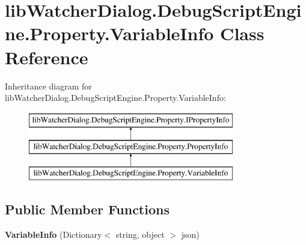 \hypertarget{classlib_watcher_dialog_1_1_debug_script_engine_1_1_property_1_1_variable_info}{\section{lib\+Watcher\+Dialog.\+Debug\+Script\+Engine.\+Property.\+Variable\+Info Class Reference}
\label{classlib_watcher_dialog_1_1_debug_script_engine_1_1_property_1_1_variable_info}
}
Inheritance diagram for lib\+Watcher\+Dialog.\+Debug\+Script\+Engine.\+Property.\+Variable\+Info\+:\begin{figure}[H]
\begin{center}
\leavevmode
\includegraphics[height=3.000000cm]{classlib_watcher_dialog_1_1_debug_script_engine_1_1_property_1_1_variable_info}
\end{center}
\end{figure}
\subsection*{Public Member Functions}
\begin{DoxyCompactItemize}
\item 
\hypertarget{classlib_watcher_dialog_1_1_debug_script_engine_1_1_property_1_1_variable_info_ad91f1d5831ca6580e04fabfc2c923c83}{{\bfseries Variable\+Info} (Dictionary$<$ string, object $>$ json)}\label{classlib_watcher_dialog_1_1_debug_script_engine_1_1_property_1_1_variable_info_ad91f1d5831ca6580e04fabfc2c923c83}

\end{DoxyCompactItemize}
